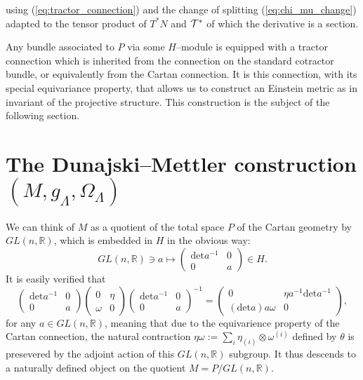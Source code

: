 using (\ref{eq:tractor_connection}) and the change of splitting (\ref{eq:chi_mu_change}) adapted to the tensor product of $T^*N$ and $ \mathcal{T}^*$ of which the derivative is a section.


Any bundle associated to $P$ via some $H$--module is equipped with a tractor connection which is inherited from the connection on the standard cotractor bundle, or equivalently from the Cartan connection. It is this connection, with its special equivariance property, that allows us to construct an Einstein metric as in invariant of the projective structure. This construction is the subject of the following section.

\section{The Dunajski--Mettler construction $(M,g_\Lambda,\Omega_\Lambda)$}

We can think of $M$ as a quotient of the total space $P$ of the
Cartan geometry by $GL(n,\mathbb{R})$, which is embedded in $H$
in the obvious way:
\[
GL(n,\mathbb{R})\ni a\longmapsto\begin{pmatrix}\mathrm{det}a^{-1} & 0\\
0 & a
\end{pmatrix}\in H.
\]
It is easily verified that 
\[
\begin{pmatrix}\mathrm{det}a^{-1} & 0\\
0 & a
\end{pmatrix}\begin{pmatrix}0 & \eta\\
\omega & 0
\end{pmatrix}\begin{pmatrix}\mathrm{det}a^{-1} & 0\\
0 & a
\end{pmatrix}^{-1}=\begin{pmatrix}0 & \eta a^{-1}\mathrm{det}a^{-1}\\
(\mathrm{det}a)a\omega & 0
\end{pmatrix},
\]
for any $a\in GL(n,\mathbb{R})$, meaning that due to the equivarience
property of the Cartan connection, the natural contraction $\eta\omega:=\sum_{i}\eta_{(i)}\otimes\omega^{(i)}$
defined by $\theta$ is presevered by the adjoint action of this $GL(n,\mathbb{R})$
subgroup. It thus descends to a naturally defined object on the quotient
$M=P/GL(n,\mathbb{R})$.

